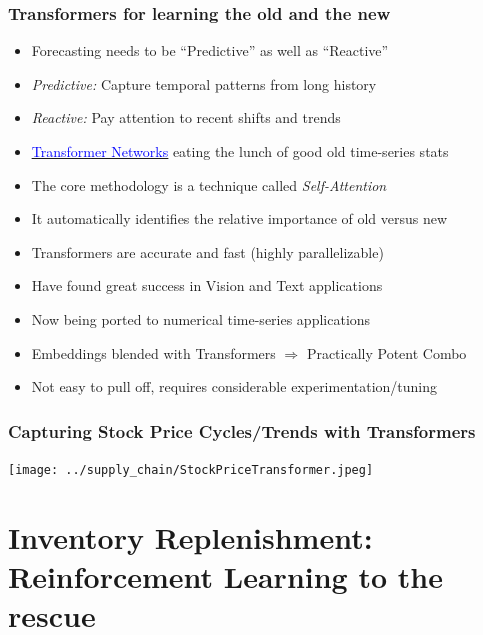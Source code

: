 \documentclass[handout]{beamer}
\begin{document}
\begin{frame}
\frametitle{Transformers for learning the old and the new}
\pause
\begin{itemize}[<+->]
\item Forecasting needs to be ``Predictive'' as well as ``Reactive''
\item {\em Predictive:} Capture temporal patterns from long history
\item {\em Reactive:} Pay attention to recent shifts and trends
\item \href{https://en.wikipedia.org/wiki/Transformer_(machine_learning_model)}{\underline{\textcolor{blue}{Transformer Networks}}} eating the lunch of good old time-series stats
\item The core methodology is a technique called {\em Self-Attention}
\item It automatically identifies the relative importance of old versus new
\item Transformers are accurate and fast (highly parallelizable)
\item Have found great success in Vision and Text applications
\item Now being ported to numerical time-series applications
\item Embeddings blended with Transformers $\Rightarrow$ Practically Potent Combo
\item Not easy to pull off, requires considerable experimentation/tuning
\end{itemize}
\end{frame}

\begin{frame}
\frametitle{Capturing Stock Price Cycles/Trends with Transformers}
\texttt{[image: ../supply\_chain/StockPriceTransformer.jpeg]}
\end{frame}

\section{Inventory Replenishment: Reinforcement Learning to the rescue}
\end{document}
